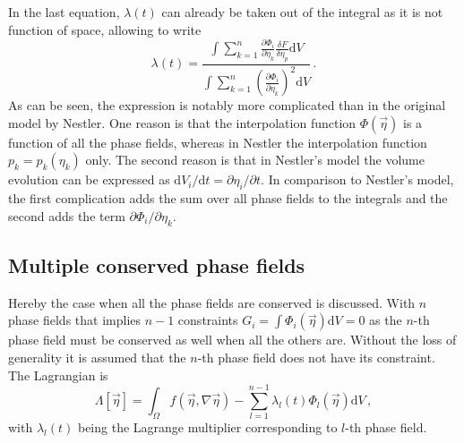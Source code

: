 In the last equation, $\lambda(t)$ can already be taken out of the integral as it is not function of space, allowing to write
\begin{equation}
	\lambda(t)=\frac{\int\sum_{k=1}^n \frac{\partial \Phi_i}{\partial \eta_k}\frac{\delta F}{\delta \eta_p} \mathrm{d}V}{\int\sum_{k=1}^n \left(\frac{\partial \Phi_i}{\partial \eta_k}\right)^2 \mathrm{d}V} \,.
\end{equation}
As can be seen, the expression is notably more complicated than in the original model by Nestler. One reason is that the interpolation function $\Phi(\vec{\eta})$ is a function of all the phase fields, whereas in Nestler the interpolation function $p_k=p_k(\eta_k)$ only.  The second reason is that in Nestler's model the volume evolution can be expressed as $\mathrm{d}V_i/\mathrm{d}t=\partial \eta_i/\partial t$. In comparison to Nestler's model, the first complication adds the sum over all phase fields to the integrals and the second adds the term $\partial \Phi_i/\partial \eta_k$.

\subsection*{Multiple conserved phase fields}
Hereby the case when all the phase fields are conserved is discussed. With $n$ phase fields that implies $n-1$ constraints $G_{i}=\int \Phi_i(\vec{\eta})\mathrm{d}V=0$ as the $n$-th phase field must be conserved as well when all the others are. Without the loss of generality it is assumed that the $n$-th phase field does not have its constraint. The Lagrangian is 
\begin{equation}
	\Lambda[\vec{\eta}]= \int_\Omega f(\vec{\eta},\nabla\vec{\eta}) - \sum_{l=1}^{n-1}\lambda_l(t)\Phi_l(\vec{\eta}) \mathrm{d}V \,,
\end{equation}
with $\lambda_l(t)$ being the Lagrange multiplier corresponding to $l$-th phase field.

